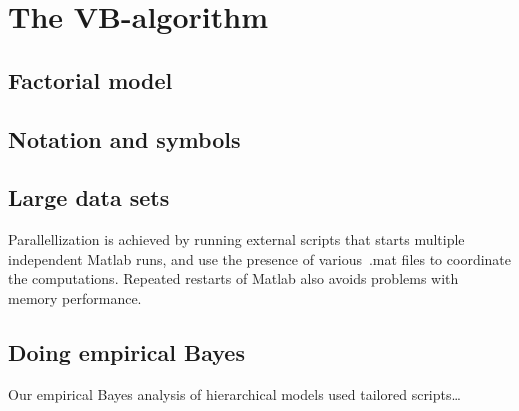 \documentclass[11pt,letterpaper,twocolumn]{article}
\begin{document}
\section{The VB-algorithm}

\subsection{Factorial model}
\subsection{Notation and symbols}
\subsection{Large data sets}
Parallellization is achieved by running external scripts that starts
multiple independent Matlab runs, and use the presence of various~.mat
files to coordinate the computations. Repeated restarts of Matlab also
avoids problems with memory performance.

\subsection{Doing empirical Bayes}
Our empirical Bayes analysis of hierarchical models used tailored
scripts\ldots


\end{document}
